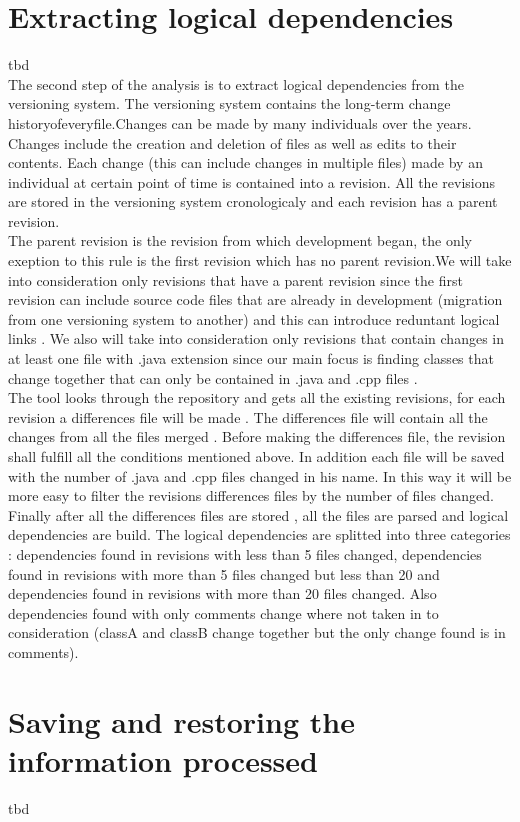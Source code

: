 \section{Extracting logical dependencies}
tbd\\
The second step of the analysis is to extract logical dependencies from the versioning system. The versioning system contains the long-term change historyofeveryﬁle.Changes can be made by many individuals over the years.\\ 
Changes include the creation and deletion of ﬁles as well as edits to their contents. Each change (this can include changes in multiple ﬁles) made by an individual at certain point of time is contained into a revision\cite{ct7}. All the revisions are stored in the versioning system cronologicaly and each revision has a parent revision. 
\\ The parent revision is the revision from which development began, the only exeption to this rule is the ﬁrst revision which has no parent revision.We will take into consideration only revisions that have a parent revision since the ﬁrst revision can include source code ﬁles that are already in development (migration from one versioning system to another) and this can introduce reduntant logical links . We also will take into consideration only revisions that contain changes in at least one ﬁle with .java extension since our main focus is ﬁnding classes that change together that can only be contained in .java and .cpp ﬁles \cite{ct8} .
\\ The tool looks through the repository and gets all the existing revisions, for each revision a diﬀerences ﬁle will be made . The diﬀerences ﬁle will contain all the changes from all the ﬁles merged . Before making the diﬀerences ﬁle, the revision shall fulﬁll all the conditions mentioned above. In addition each ﬁle will be saved with the number of .java and .cpp ﬁles changed in his name. In this way it will be more easy to ﬁlter the revisions diﬀerences ﬁles by the number of ﬁles changed. Finally after all the diﬀerences ﬁles are stored , all the ﬁles are parsed and logical dependencies are build. The logical dependencies are splitted into three categories : dependencies found in revisions with less than 5 ﬁles changed, dependencies found in revisions with more than 5 ﬁles changed but less than 20 and dependencies found in revisions with more than 20 ﬁles changed. Also dependencies found with only comments change where not taken in to consideration (classA and classB change together but the only change found is in comments).

\section{Saving and restoring the information processed}
tbd